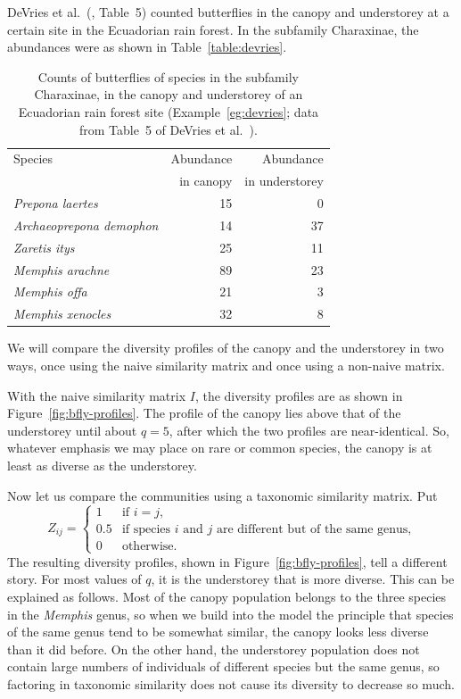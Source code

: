 \begin{example}
% 
DeVries et al.~(\cite{DML}, Table~5) counted butterflies
in the canopy and understorey at a certain site in the Ecuadorian rain
forest. In the subfamily Charaxinae, the
abundances were as shown in Table~\ref{table:devries}.
% 
\begin{table}
\centering
\begin{tabular}{|l|r|r|}
\hline
Species &Abundance      &Abundance      \\
        &in canopy      &in understorey \\
\hline
\emph{Prepona laertes}          &15     &0      \\
\emph{Archaeoprepona demophon}  &14     &37     \\
\emph{Zaretis itys}             &25     &11     \\
\emph{Memphis arachne}          &89     &23     \\
\emph{Memphis offa}             &21     &3      \\
\emph{Memphis xenocles}         &32     &8      \\
\hline
\end{tabular}
\caption{Counts of butterflies of species in the subfamily Charaxinae, in
  the canopy and understorey of an Ecuadorian rain forest site
  (Example~\ref{eg:devries}; data from Table~5 of DeVries et
  al.~\cite{DML}).}  
\end{table}
% 
We will compare the diversity profiles of the canopy and the understorey in
two ways, once using the naive similarity matrix and once using a non-naive
matrix.

With the naive similarity matrix $I$, the diversity profiles are as shown in
Figure~\ref{fig:bfly-profiles}.  The profile of the canopy
lies above that of the understorey until about $q = 5$, after which the two
profiles are near-identical.  So, whatever emphasis we may place on rare or
common species, the canopy is at least as diverse as the understorey.

Now let us compare the communities using a taxonomic similarity matrix.
Put
\[
Z_{ij}  =
\begin{cases}
1       &\text{if } i = j,      \\
0.5     &\text{if species $i$ and $j$ are different but of the same
  genus,}\\
0       &\text{otherwise}.
\end{cases}
\]
The resulting diversity profiles, shown in
Figure~\ref{fig:bfly-profiles}, tell a different story.  For
most values of $q$, it is the understorey that is more diverse.  This can
be explained as follows.  Most of the canopy population belongs to the
three species in the \emph{Memphis} genus, so when we build into the model
the principle that species of the same genus tend to be somewhat similar,
the canopy looks less diverse than it did before.  On the other hand,
the understorey population does not contain large numbers of individuals of
different species but the same genus, so factoring in taxonomic similarity
does not cause its diversity to decrease so much.


\end{example}
